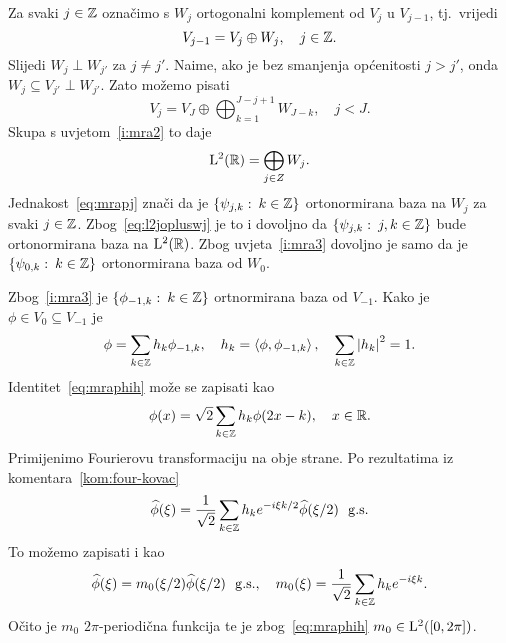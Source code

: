 \documentclass[main.tex]{subfiles}
\begin{document}
Za svaki \( j \in \mathbb{Z} \) označimo s \( W_j \) ortogonalni komplement od \( V_j \)
u \( V_{j-1} \), tj.\ vrijedi
\begin{equation}
	V_{j-1} = V_j \oplus W_j, \quad j \in \mathbb{Z}.
\end{equation}
Slijedi \( W_j \perp W_{j'} \) za \( j \neq j' \). Naime, ako je bez smanjenja općenitosti
\( j > j' \), onda \( W_j \subseteq V_{j'} \perp W_{j'} \). Zato možemo pisati
\begin{equation}
	V_j = V_J \oplus \bigoplus_{k=1}^{J-j+1} W_{J-k}, \quad j < J.
\end{equation}
Skupa s uvjetom~\ref{i:mra2} to daje
\begin{equation}\label{eq:l2jopluswj}
	\mathrm{L}^2(\mathbb{R}) = \bigoplus_{j \in Z} W_j.
\end{equation}
Jednakost~\eqref{eq:mrapj} znači da je
\( \left\{ \psi_{j,k} \, \colon \, k \in \mathbb{Z} \right\} \) ortonormirana baza
na \( W_j \) za svaki \( j \in \mathbb{Z} \). Zbog~\eqref{eq:l2jopluswj}
je to i dovoljno da \( \left\{ \psi_{j,k} \, \colon \, j,k \in \mathbb{Z} \right\} \)
bude ortonormirana baza na \( \mathrm{L}^2(\mathbb{R}) \). Zbog uvjeta~\ref{i:mra3}
dovoljno je samo da je \( \left\{ \psi_{0,k} \, \colon \, k \in \mathbb{Z} \right\} \)
ortonormirana baza od \( W_0 \).

Zbog~\ref{i:mra3} je \( \left\{ \phi_{-1, k} \, \colon \, k \in \mathbb{Z} \right\} \)
ortnormirana baza od \( V_{-1} \). Kako je \( \phi \in V_0 \subseteq V_{-1} \)
je
\begin{equation}\label{eq:mraphih}
	\phi = \sum_{k \in \mathbb{Z}} h_k \phi_{-1,k}, \quad h_k = \left\langle {\phi}, {\phi_{-1,k}} \right\rangle,
	\quad \sum_{k \in \mathbb{Z}} \left| {h_k} \right|^2 = 1.
\end{equation}
Identitet~\eqref{eq:mraphih} može se zapisati kao
\begin{equation}
	\phi(x) = \sqrt 2 \sum_{k \in \mathbb{Z}} h_k \phi(2x-k), \quad x \in \mathbb{R}.
\end{equation}
Primijenimo Fourierovu transformaciju na obje strane. Po rezultatima iz komentara~\ref{kom:four-kovac}
\newcommand{\mathgs}{\ \ \mathrm{g.s.}}
\begin{equation}
	\wh \phi(\xi) = \frac 1{\sqrt 2} \sum_{k \in \Z}
	h_k e^{-i\xi k/2} \wh \phi(\xi/2) \mathgs
\end{equation}
To možemo zapisati i kao
\begin{equation}\label{eq:mraphim0}
	\wh \phi(\xi) = m_0(\xi/2)\wh \phi(\xi/2) \mathgs, \quad
	m_0(\xi) = \frac 1{\sqrt 2} \sum_{k \in \Z} h_k e^{-i\xi k}.
\end{equation}
Očito je \( m_0 \) \( 2\pi \)-periodična funkcija te je
zbog~\eqref{eq:mraphih} \( m_0 \in \mathrm{L}^2([0,2\pi]) \).
\end{document}
